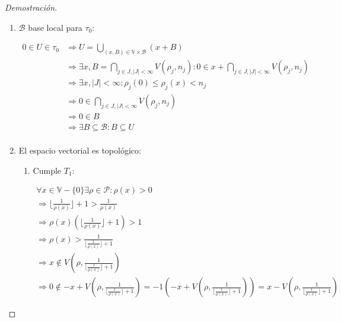 \begin{proof}[Demostración]
\begin{enumerate}
		\begin{align*}
			\lambda \in\overline{B_1(0)}, x \in B = \bigcap_{j \in J , |J| < \infty} V(\rho_j,n_j) &\Rightarrow \forall j \in J, \rho_j (x) < n_j \\
			&\Rightarrow \forall j \in J, \rho_j (\lambda x) = |\lambda|\rho_j (x) \leq \rho_j (x) < n_j \\    
			&\Rightarrow \lambda x \in \bigcap_{j \in J , |J| < \infty} V(\rho_j,n_j)  = B
		\end{align*}
		
		\item $\mathcal{B}$ base local para $\tau_0$:
		
		\begin{align*}
			0 \in U \in \tau_0 &\Rightarrow U = \bigcup_{(x,B) \in \mathbb{V} \times \mathcal{B}} (x + B) \\
			&\Rightarrow \exists x, B = \bigcap_{j \in J , |J| < \infty} V(\rho_j,n_j) : 0 \in x + \bigcap_{j \in J , |J| < \infty} V(\rho_j,n_j) \\
			&\Rightarrow \exists x, |J|<\infty : \rho_{j}(0) \leq \rho_j(x) < n_j \\
			&\Rightarrow 0 \in \bigcap_{j \in J , |J| < \infty} V(\rho_j,n_j) \\
			&\Rightarrow 0 \in B \\
			&\Rightarrow \exists B \subseteq \mathcal{B} : B \subseteq U \\
		\end{align*}
		
		\item El espacio vectorial es topológico:
		
		\begin{enumerate}
			\item Cumple $T_1$:
			
			\begin{gather*}
				\forall x \in \mathbb{V} - \{0\} \exists \rho \in \mathcal{P}:  \rho(x)>0\\
				\Rightarrow \lfloor \frac{1}{\rho(x)} \rfloor + 1 > \frac{1}{\rho(x)}\\
				\Rightarrow \rho(x)(\lfloor \frac{1}{\rho(x)} \rfloor + 1) >1 \\
				\Rightarrow \rho(x) >\frac{1}{\lfloor \frac{1}{\rho(x)} \rfloor + 1} \\
				\Rightarrow x \notin V(\rho , \frac{1}{\lfloor \frac{1}{\rho(x)} \rfloor + 1})   \\
				\Rightarrow 0 \notin -x+ V(\rho , \frac{1}{\lfloor \frac{1}{\rho(x)} \rfloor + 1}) = -1(-x+ V(\rho , \frac{1}{\lfloor \frac{1}{\rho(x)} \rfloor + 1}) ) = x - V(\rho , \frac{1}{\lfloor \frac{1}{\rho(x)} \rfloor + 1}) 
			\end{gather*}
			

\end{enumerate}
\end{enumerate}
\end{proof}
